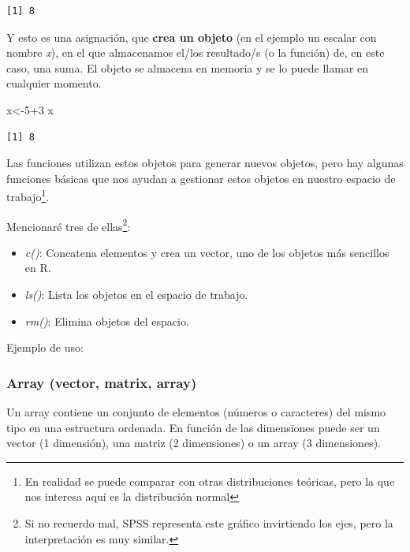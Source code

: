 \documentclass[
  letterpaper,
  DIV=11,
  numbers=noendperiod]{scrreprt}
\newenvironment{Shaded}{\begin{snugshade}}{\end{snugshade}}
\newcommand{\DecValTok}[1]{\textcolor[rgb]{0.68,0.00,0.00}{#1}}
\newcommand{\NormalTok}[1]{\textcolor[rgb]{0.00,0.23,0.31}{#1}}
\newcommand{\OtherTok}[1]{\textcolor[rgb]{0.00,0.23,0.31}{#1}}
\newcommand{\SpecialCharTok}[1]{\textcolor[rgb]{0.37,0.37,0.37}{#1}}
\providecommand{\tightlist}{%
  \setlength{\itemsep}{0pt}\setlength{\parskip}{0pt}}\usepackage{longtable,booktabs,array}
\begin{document}
\begin{verbatim}
[1] 8
\end{verbatim}

Y esto es una asignación, que \textbf{crea un objeto} (en el ejemplo un
escalar con nombre \emph{x}), en el que almacenamos el/los resultado/s
(o la función) de, en este caso, una suma. El objeto se almacena en
memoria y se lo puede llamar en cualquier momento.

\begin{Shaded}
\begin{Highlighting}[]
\NormalTok{x}\OtherTok{\textless{}{-}}\DecValTok{5}\SpecialCharTok{+}\DecValTok{3}
\NormalTok{x}
\end{Highlighting}
\end{Shaded}

\begin{verbatim}
[1] 8
\end{verbatim}

Las funciones utilizan estos objetos para generar nuevos objetos, pero
hay algunas funciones básicas que nos ayudan a gestionar estos objetos
en nuestro espacio de trabajo\footnote{En realidad se puede comparar con
  otras distribuciones teóricas, pero la que nos interesa aquí es la
  distribución normal}.

Mencionaré tres de ellas\footnote{Si no recuerdo mal, SPSS representa
  este gráfico invirtiendo los ejes, pero la interpretación es muy
  similar.}:

\begin{itemize}
\tightlist
\item
  \emph{c()}: Concatena elementos y crea un vector, uno de los objetos
  más sencillos en R.
\item
  \emph{ls()}: Lista los objetos en el espacio de trabajo.
\item
  \emph{rm()}: Elimina objetos del espacio.
\end{itemize}

Ejemplo de uso:

\hypertarget{array-vector-matrix-array}{%
\subsubsection{Array (vector, matrix,
array)}\label{array-vector-matrix-array}}

Un array contiene un conjunto de elementos (números o caracteres) del
mismo tipo en una estructura ordenada. En función de las dimensiones
puede ser un vector (1 dimensión), una matriz (2 dimensiones) o un array
(3 dimensiones).
\end{document}
